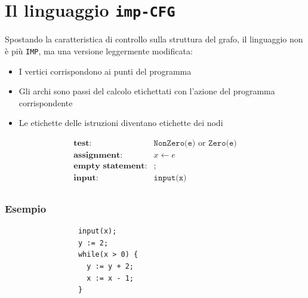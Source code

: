 \section{Il linguaggio \texttt{imp-CFG}}
Spostando la caratteristica di controllo sulla struttura del grafo,
il linguaggio non è più \verb|IMP|, ma una versione leggermente modificata:
\begin{itemize}
    \item I vertici corrispondono ai punti del programma
    \item Gli archi sono passi del calcolo etichettati con l'azione del programma corrispondente
    \item Le etichette delle istruzioni diventano etichette dei nodi
\end{itemize}
\[
  \begin{array}{lcl}
    \textbf{test:} & \texttt{NonZero(e)} \text{ or } \texttt{Zero(e)} \\
    \textbf{assignment:} & x \leftarrow e \\
    \textbf{empty statement:} & ; \\
    \textbf{input:} & \texttt{input(x)} \\
    \end{array}
\]
\subsubsection{Esempio}
\begin{figure}[H]
  \begin{subfigure}{0.5\textwidth}
    \begin{verbatim}
      input(x);
      y := 2;
      while(x > 0) {
        y := y + 2;
        x := x - 1;
      }
    \end{verbatim}
  \end{subfigure}
  \begin{subfigure}{0.5\textwidth}
  \end{subfigure}
\end{figure} 

